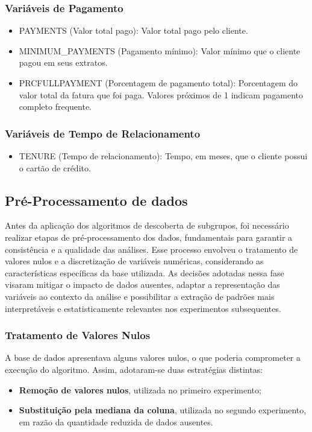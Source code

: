 \documentclass[12pt]{article}
\begin{document}
\subsubsection{Variáveis de Pagamento}
\begin{itemize}
    \item PAYMENTS (Valor total pago): Valor total pago pelo cliente.
    \item MINIMUM\_PAYMENTS (Pagamento mínimo): Valor mínimo que o cliente pagou em seus extratos.
    \item PRCFULLPAYMENT (Porcentagem de pagamento total): Porcentagem do valor total da fatura que foi paga. Valores próximos de 1 indicam pagamento completo frequente.
\end{itemize}

\subsubsection{Variáveis de Tempo de Relacionamento}
\begin{itemize}
    \item TENURE (Tempo de relacionamento): Tempo, em meses, que o cliente possui o cartão de crédito.
\end{itemize}

\subsection{Pré-Processamento de dados}

Antes da aplicação dos algoritmos de descoberta de subgrupos, foi necessário realizar etapas de pré-processamento dos dados, fundamentais para garantir a consistência e a qualidade das análises. Esse processo envolveu o tratamento de valores nulos e a discretização de variáveis numéricas, considerando as características específicas da base utilizada. As decisões adotadas nessa fase visaram mitigar o impacto de dados ausentes, adaptar a representação das variáveis ao contexto da análise e possibilitar a extração de padrões mais interpretáveis e estatisticamente relevantes nos experimentos subsequentes.

\subsubsection{Tratamento de Valores Nulos}

A base de dados apresentava alguns valores nulos, o que poderia comprometer a execução do algoritmo. Assim, adotaram-se duas estratégias distintas:
\begin{itemize}
    \item \textbf{Remoção de valores nulos}, utilizada no primeiro experimento;
    \item \textbf{Substituição pela mediana da coluna}, utilizada no segundo experimento, em razão da quantidade reduzida de dados ausentes.
\end{itemize}
\end{document}
